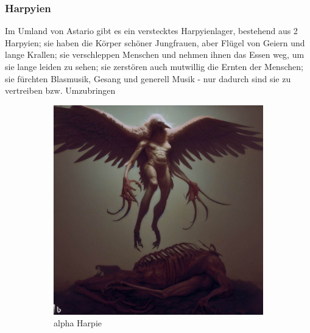 \documentclass[11pt, twoside]{article}
\begin{document}
\subsubsection{Harpyien\label{harpie}}
\label{sec:org07a8a0d}
Im Umland von Astario gibt es ein verstecktes Harpyienlager, bestehend aus 2 Harpyien; sie haben die Körper schöner Jungfrauen, aber Flügel von Geiern und lange Krallen; sie verschleppen Menschen und nehmen ihnen das Essen weg, um sie lange leiden zu sehen; sie zerstören auch mutwillig die Ernten der Menschen; sie fürchten Blasmusik, Gesang und generell Musik - nur dadurch sind sie zu vertreiben bzw. Umzubringen
\begin{figure}[H]
\centering
\caption{Harpyien}
\label{fig:harpie}
  \begin{subfigure}{0.3\textwidth}
    \centering
    \includegraphics[width=0.99\linewidth]{harpie1.jpeg}
    \caption{alpha Harpie}
  \end{subfigure}%
  \begin{subfigure}{0.3\textwidth}
    \centering

\end{subfigure}
\end{figure}
\end{document}
